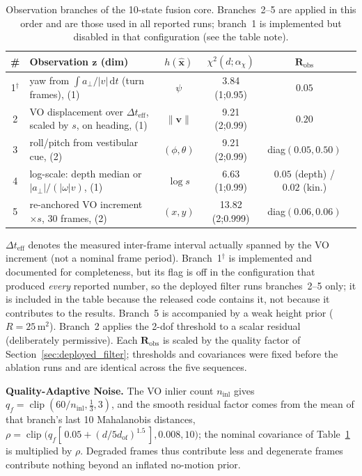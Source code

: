 \begin{table}[!htbp]
    \centering
    \caption{Observation branches of the 10-state fusion core. Branches~2--5 are applied in this order and are those used in all reported runs; branch~1 is implemented but disabled in that configuration (see the table note).}
    \label{tab:gates}
    \footnotesize
    \begin{tabularx}{\textwidth}{@{}c >{\RaggedRight\arraybackslash}X c c c c@{}}
        \toprule
        \# & Observation $\mathbf{z}$ (dim) & $h(\hat{\mathbf{x}})$ & $\chi^2(d;\alpha_\chi)$ & $\mathbf{R}_{\mathrm{obs}}$ \\
        \midrule
        1$^{\dagger}$ & yaw from $\int a_\perp/|v|\,\mathrm{d}t$ (turn frames), (1) & $\psi$ & 3.84 (1;0.95) & $0.05$ \\
        2 & VO displacement over $\Delta t_{\mathrm{eff}}$, scaled by $s$, on heading, (1) & $\lVert\mathbf{v}\rVert$ & 9.21 (2;0.99) & $0.20$ \\
        3 & roll/pitch from vestibular cue, (2) & $(\phi,\theta)$ & 9.21 (2;0.99) & diag$(0.05,0.50)$ \\
        4 & log-scale: depth median or $|a_\perp|/(|\omega|v)$, (1) & $\log s$ & 6.63 (1;0.99) & $0.05$ (depth) / $0.02$ (kin.) \\
        5 & re-anchored VO increment $\times s$, 30 frames, (2) & $(x,y)$ & 13.82 (2;0.999) & diag$(0.06,0.06)$ \\
        \bottomrule
    \end{tabularx}

    \vspace{2pt}
    {\footnotesize $\Delta t_{\mathrm{eff}}$ denotes the measured inter-frame interval actually spanned by the VO increment (not a nominal frame period). Branch~1$^{\dagger}$ is implemented and documented for completeness, but its flag is off in the configuration that produced \emph{every} reported number, so the deployed filter runs branches~2--5 only; it is included in the table because the released code contains it, not because it contributes to the results. Branch~5 is accompanied by a weak height prior ($R=25$\,m$^2$). Branch~2 applies the 2-dof threshold to a scalar residual (deliberately permissive). Each $\mathbf{R}_{\mathrm{obs}}$ is scaled by the quality factor of Section~\ref{sec:deployed_filter}; thresholds and covariances were fixed before the ablation runs and are identical across the five sequences.}
\end{table}

\textbf{Quality-Adaptive Noise.} The VO inlier count $n_{\mathrm{inl}}$ gives $q_f=\operatorname{clip}(60/n_{\mathrm{inl}},\tfrac13,3)$, and the smooth residual factor comes from the mean of that branch's last 10 Mahalanobis distances, $\rho=\operatorname{clip}\big(q_f[\,0.05+(d/5d_{\mathrm{of}})^{1.5}\,],0.008,10\big)$; the nominal covariance of Table~\ref{tab:gates} is multiplied by $\rho$. Degraded frames thus contribute less and degenerate frames contribute nothing beyond an inflated no-motion prior.

